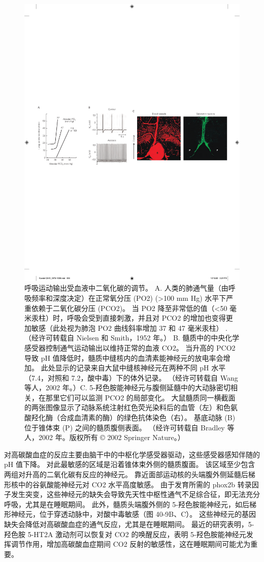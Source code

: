 \begin{figure}[htbp]
	\centering
	\includegraphics[width=0.65\linewidth]{chap40/fig_40_9}
	\caption{呼吸运动输出受血液中二氧化碳的调节。 A. 人类的肺通气量（由呼吸频率和深度决定）在正常氧分压 (PO2) (>100 mm Hg) 水平下严重依赖于二氧化碳分压 (PCO2)。 当 PO2 降至非常低的值（<50 毫米汞柱）时，呼吸会受到直接刺激，并且对 PCO2 的增加也变得更加敏感（此处视为肺泡 PO2 曲线斜率增加 37 和 47 毫米汞柱） . （经许可转载自 Nielsen 和 Smith，1952 年。） B. 髓质中的中央化学感受器控制通气运动输出以维持正常的血液 CO2。 当升高的 PCO2 导致 pH 值降低时，髓质中缝核内的血清素能神经元的放电率会增加。 此处显示的记录来自大鼠中缝核神经元在两种不同 pH 水平（7.4，对照和 7.2，酸中毒）下的体外记录。 （经许可转载自 Wang 等人，2002 年。）C. 5-羟色胺能神经元与腹侧延髓中的大动脉密切相关，在那里它们可以监测 PCO2 的局部变化。 大鼠髓质同一横截面的两张图像显示了动脉系统注射红色荧光染料后的血管（左）和色氨酸羟化酶（合成血清素的酶）的绿色抗体染色（右）。 基底动脉 (B) 位于锥体束 (P) 之间的髓质腹侧表面。 （经许可转载自 Bradley 等人，2002 年。版权所有 © 2002 Springer Nature。）}
	\label{fig:40_9}
\end{figure}

对高碳酸血症的反应主要由脑干中的中枢化学感受器驱动，这些感受器感知伴随的 pH 值下降。 对此最敏感的区域是沿着锥体束外侧的髓质腹面。 该区域至少包含两组对升高的二氧化碳有反应的神经元。 靠近面部运动核的头端腹外侧延髓后梯形核中的谷氨酸能神经元对 CO2 水平高度敏感。 由于发育所需的 phox2b 转录因子发生突变，这些神经元的缺失会导致先天性中枢性通气不足综合征，即无法充分呼吸，尤其是在睡眠期间。 此外，髓质头端腹外侧的 5-羟色胺能神经元，如后梯形神经元，位于穿透动脉中，对酸中毒敏感（图 40-9B、C）。 这些神经元的基因缺失会降低对高碳酸血症的通气反应，尤其是在睡眠期间。 最近的研究表明，5-羟色胺 5-HT2A 激动剂可以恢复对 CO2 的唤醒反应，表明 5-羟色胺能神经元发挥调节作用，增加高碳酸血症期间 CO2 反射的敏感性，这在睡眠期间可能尤为重要。

